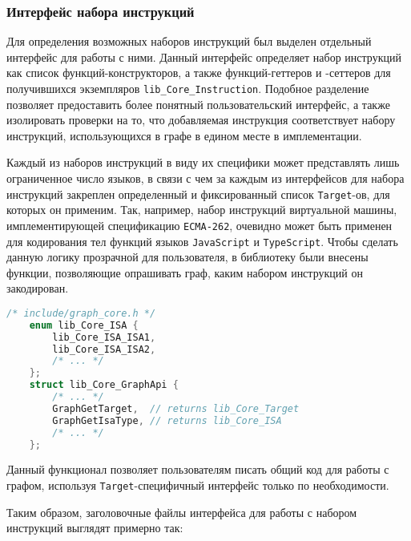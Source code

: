 \subsubsection{Интерфейс набора инструкций}

Для определения возможных наборов инструкций был выделен отдельный интерфейс для работы с ними. Данный интерфейс определяет набор инструкций как список функций-конструкторов, а также функций-геттеров и -сеттеров для получившихся экземпляров \texttt{lib\_Core\_Instruction}. Подобное разделение позволяет предоставить более понятный пользовательский интерфейс, а также изолировать проверки на то, что добавляемая инструкция соответствует набору инструкций, использующихся в графе в едином месте в имплементации.

Каждый из наборов инструкций в виду их специфики может представлять лишь ограниченное число языков, в связи с чем за каждым из интерфейсов для набора инструкций закреплен определенный и фиксированный список \texttt{Target}-ов, для которых он применим. Так, например, набор инструкций виртуальной машины, имплементирующей спецификацию \texttt{ECMA-262}, очевидно может быть применен для кодирования тел функций языков \texttt{JavaScript} и \texttt{TypeScript}. Чтобы сделать данную логику прозрачной для пользователя, в библиотеку были внесены функции, позволяющие опрашивать граф, каким набором инструкций он закодирован.

\begin{lstlisting}[language=C, label=lst:libIsaApi]
    /* include/graph_core.h */
    enum lib_Core_ISA {
        lib_Core_ISA_ISA1,
        lib_Core_ISA_ISA2,
        /* ... */
    };
    struct lib_Core_GraphApi {
        /* ... */
        GraphGetTarget,  // returns lib_Core_Target
        GraphGetIsaType, // returns lib_Core_ISA
        /* ... */
    };
\end{lstlisting}

Данный функционал позволяет пользователям писать общий код для работы с графом, используя \texttt{Target}-специфичный интерфейс только по необходимости.

Таким образом, заголовочные файлы интерфейса для работы с набором инструкций выглядят примерно так:


